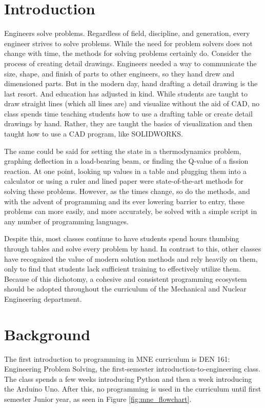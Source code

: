 \section{Introduction}

Engineers solve problems. Regardless of field, discipline, and generation, every engineer
strives to solve problems. While the need for problem solvers does not change with time,
the methods for solving problems certainly do. Consider the process of creating detail 
drawings. Engineers needed a way to communicate the size, shape, and finish of parts to 
other engineers, so they hand drew and dimensioned parts. But in the modern day, 
hand drafting a detail drawing is the last resort. And education has adjusted in
kind. While students are taught to draw straight lines (which all lines are) and visualize
without the aid of CAD, no class spends time teaching students how to use a drafting table
or create detail drawings by hand. Rather, they are taught the basics of visualization
and then taught how to use a CAD program, like SOLIDWORKS.

The same could be said for setting the state in a thermodynamics problem, graphing
deflection in a load-bearing beam, or finding the Q-value of a fission reaction. At one
point, looking up values in a table and plugging them into a calculator or using a ruler
and lined paper were state-of-the-art methods for solving these problems. However, as the 
times change, so do the methods, and with the advent of programming and its ever lowering 
barrier to entry, these problems can more easily, and more accurately, be solved with a 
simple script in any number of programming languages.

Despite this, most classes continue to have students spend hours thumbing through tables
and solve every problem by hand. In contrast to this, other classes have recognized the
value of modern solution methods and rely heavily on them, only to find that students
lack sufficient training to effectively utilize them. Because of this dichotomy, a cohesive 
and consistent programming ecosystem should be adopted throughout the curriculum 
of the Mechanical and Nuclear Engineering department.


\section{Background}

The first introduction to programming in MNE curriculum is DEN 161: Engineering Problem Solving,
the first-semester introduction-to-engineering class. The class spends a few weeks introducing
Python and then a week introducing the Arduino Uno. After this, no programming is used in the
curriculum until first semester Junior year, as seen in Figure \ref{fig:mne_flowchart}. 

